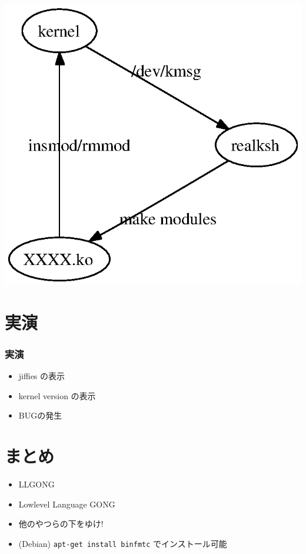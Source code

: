 \documentclass[cjk,dvipdfmx,14pt]{beamer}
\begin{document}
\begin{frame}
\includegraphics[width=0.7\hsize]{image200609/structure.eps}
\end{frame}

\section{実演}
\begin{frame}
\frametitle{実演}
\begin{itemize}
 \item jiffies の表示
 \item kernel version の表示
 \item BUGの発生
\end{itemize}
\end{frame}

\section{まとめ}
\begin{frame}
\begin{center}
 \begin{minipage}{0.6\hsize}
 \begin{itemize}[<+->]
 \item LLGONG
 \item Lowlevel Language GONG 
 \item 他のやつらの下をゆけ!
  \item (Debian) \texttt{apt-get install binfmtc} でインストール可能
 \end{itemize}
 \end{minipage}
\end{center}
\end{frame}
\end{document}
